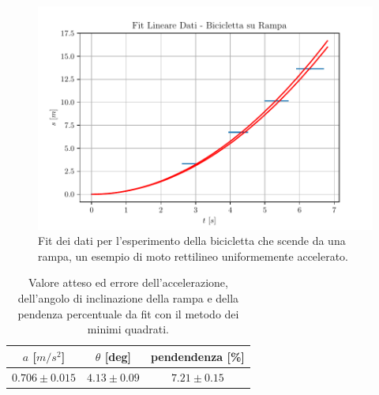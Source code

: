 \documentclass{report} \usepackage[T1]{fontenc} \usepackage[italian]{babel}
\begin{document}
\begin{figure}[H]
  \centering
  \includegraphics[width=\textwidth]{fit_bike}
  \caption{Fit dei dati per l'esperimento della bicicletta che scende da una rampa,
           un esempio di moto rettilineo uniformemente accelerato.}
  \label{fig:fit_bike}
\end{figure}

\begin{table}[H]
  \renewcommand{\arraystretch}{1.5}
  \centering
  \begin{tabular}{ | c | c | c | }
    \hline
    $a$ [$m/s^2$] &  $\theta$ [deg] & pendendenza [\%] \\
    \hline
    $0.706\pm0.015$ & $4.13\pm0.09$ & $7.21\pm0.15$ \\
    \hline
  \end{tabular}
  \caption{Valore atteso ed errore dell'accelerazione, dell'angolo di inclinazione della rampa
           e della pendenza percentuale da fit con il metodo dei minimi quadrati.}
  \label{tab:fit_bike}
\end{table}

{}

\end{document}
